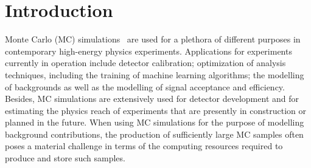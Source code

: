 \section{Introduction}
\label{sec:introduction}

Monte Carlo (MC) simulations~\cite{Kroese2014WhyTM,dunn2011exploring} are used for a plethora of different purposes in contemporary high-energy physics experiments.
Applications for experiments currently in operation include detector calibration; optimization of analysis techniques, including the training of machine learning algorithms;
the modelling of backgrounds as well as the modelling of signal acceptance and efficiency.
Besides, MC simulations are extensively used for detector development and for estimating the physics reach of experiments that are presently in construction or planned in the future.
When using MC simulations for the purpose of modelling background contributions,
the production of sufficiently large MC samples often poses a material challenge in terms of the computing resources required to produce and store such samples.


